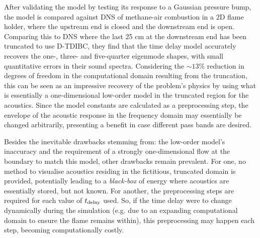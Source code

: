 After validating the model by testing its response to a Gaussian pressure bump, the model is compared against DNS of methane-air combustion in a 2D flame holder, where the upstream end is closed and the downstream end is open. Comparing this to DNS where the last 25 cm at the downstream end has been truncated to use D-TDIBC, they find that the time delay model accurately recovers the one-, three- and five-quarter eigenmode shapes, with small quantitative errors in their sound spectra. Considering the $\sim 13\%$ reduction in degrees of freedom in the computational domain resulting from the truncation, this can be seen as an impressive recovery of the problem's physics by using what is essentially a one-dimensional low-order model in the truncated region for the acoustics. Since the model constants are calculated as a preprocessing step, the envelope of the acoustic response in the frequency domain may essentially be changed arbitrarily, presenting a benefit in case different pass bands are desired.

Besides the inevitable drawbacks stemming from: the low-order model's inaccuracy and the requirement of a strongly one-dimensional flow at the boundary to match this model, other drawbacks remain prevalent. For one, no method to visualise acoustics residing in the fictitious, truncated domain is provided, potentially leading to a \emph{black-box} of energy where acoustics are essentially stored, but not known. For another, the preprocessing steps are required for each value of $t_{\rm{delay}}$ used. So, if the time delay were to change dynamically during the simulation (e.g. due to an expanding computational domain to ensure the flame remains within), this preprocessing may happen each step, becoming computationally costly.





